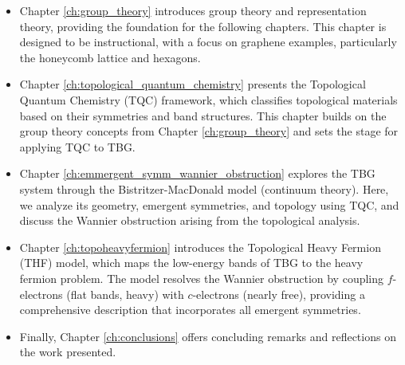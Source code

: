 \begin{itemize}
\item Chapter \ref{ch:group_theory} introduces group theory and representation theory, providing the foundation for the following chapters. This chapter is designed to be instructional, with a focus on graphene examples, particularly the honeycomb lattice and hexagons.

\item Chapter \ref{ch:topological_quantum_chemistry} presents the Topological Quantum Chemistry (TQC) framework, which classifies topological materials based on their symmetries and band structures. This chapter builds on the group theory concepts from Chapter \ref{ch:group_theory} and sets the stage for applying TQC to TBG.

\item Chapter \ref{ch:emmergent_symm_wannier_obstruction} explores the TBG system through the Bistritzer-MacDonald model (continuum theory). Here, we analyze its geometry, emergent symmetries, and topology using TQC, and discuss the Wannier obstruction arising from the topological analysis.

\item Chapter \ref{ch:topoheavyfermion} introduces the Topological Heavy Fermion (THF) model, which maps the low-energy bands of TBG to the heavy fermion problem. The model resolves the Wannier obstruction by coupling $f$-electrons (flat bands, heavy) with $c$-electrons (nearly free), providing a comprehensive description that incorporates all emergent symmetries.

\item Finally, Chapter \ref{ch:conclusions} offers concluding remarks and reflections on the work presented.
\end{itemize}





%



